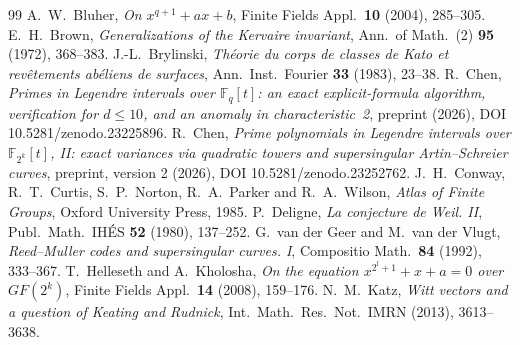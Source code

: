 \documentclass[12pt,a4paper]{amsart}
\theoremstyle{definition}
\newcommand{\F}{\mathbb{F}}
\begin{document}
\clearpage
\begin{thebibliography}{99}
 A.~W.~Bluher, \emph{On $x^{q+1}+ax+b$}, Finite Fields Appl.\ \textbf{10} (2004), 285--305.
 E.~H.~Brown, \emph{Generalizations of the Kervaire invariant}, Ann.\ of Math.\ (2) \textbf{95} (1972), 368--383.
 J.-L.~Brylinski, \emph{Th\'eorie du corps de classes de Kato et rev\^etements ab\'eliens de surfaces}, Ann.\ Inst.\ Fourier \textbf{33} (1983), 23--38.
 R.~Chen, \emph{Primes in Legendre intervals over $\F_q[t]$: an exact explicit-formula algorithm, verification for $d\le10$, and an anomaly in characteristic~2}, preprint (2026), DOI 10.5281/zenodo.23225896.
 R.~Chen, \emph{Prime polynomials in Legendre intervals over $\F_{2^k}[t]$, II: exact variances via quadratic towers and supersingular Artin--Schreier curves}, preprint, version 2 (2026), DOI 10.5281/zenodo.23252762.
 J.~H.~Conway, R.~T.~Curtis, S.~P.~Norton, R.~A.~Parker and R.~A.~Wilson, \emph{Atlas of Finite Groups}, Oxford University Press, 1985.
 P.~Deligne, \emph{La conjecture de Weil. II}, Publ.\ Math.\ IH\'ES \textbf{52} (1980), 137--252.
 G.~van der Geer and M.~van der Vlugt, \emph{Reed--Muller codes and supersingular curves. I}, Compositio Math.\ \textbf{84} (1992), 333--367.
 T.~Helleseth and A.~Kholosha, \emph{On the equation $x^{2^l+1}+x+a=0$ over $GF(2^k)$}, Finite Fields Appl.\ \textbf{14} (2008), 159--176.
 N.~M.~Katz, \emph{Witt vectors and a question of Keating and Rudnick}, Int.\ Math.\ Res.\ Not.\ IMRN (2013), 3613--3638.
\end{thebibliography}
\end{document}
